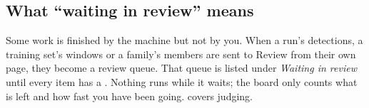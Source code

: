 \subsection{What ``waiting in review'' means}
Some work is finished by the machine but not by you. When a run's detections, a training set's
windows or a family's members are sent to Review from their own page, they become a review queue.
That queue is listed under \emph{Waiting in review} until every item has a
. Nothing runs while it waits; the board only counts what is left and how fast
you have been going.  covers judging.
